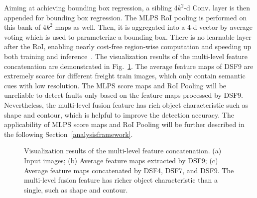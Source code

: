 Aiming at achieving bounding box regression, a sibling 4$k^2$-d Conv. layer is then appended for bounding box regression. The MLPS RoI pooling is performed on this bank of 4$k^2$ maps as well. Then, it is aggregated into a 4-d vector by average voting which is used to parameterize a bounding box. There is no learnable layer after the RoI, enabling nearly cost-free region-wise computation and speeding up both training and inference~\cite{RenHGS15}. The visualization results of the multi-level feature concatenation are demonstrated in Fig.~\ref{fig:vis_MLPS}. The average feature maps of DSF9 are extremely scarce for different freight train images, which only contain semantic cues with low resolution. The MLPS score maps and RoI Pooling will be unreliable to detect faults only based on the feature maps processed by DSF9. Nevertheless, the multi-level fusion feature has rich object characteristic such as shape and contour, which is helpful to improve the detection accuracy. The applicability of MLPS score maps and RoI Pooling will be further described in the following Section~\ref{analysisframework}.

\begin{figure}[!t]
	\centering
    \hspace{0.1em}
    \hspace{0.1em}
	\caption{Visualization results of the multi-level feature concatenation. (a) Input images; (b) Average feature maps extracted by DSF9; (c) Average feature maps concatenated by DSF4, DSF7, and DSF9. The multi-level fusion feature has richer object characteristic than a single, such as shape and contour.}
	\label{fig:vis_MLPS}
\end{figure} 